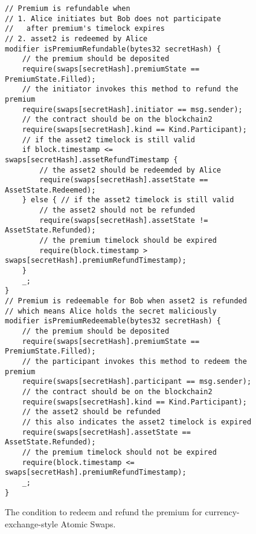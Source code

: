 \begin{figure}
\begin{lstlisting}[language=Solidity, basicstyle=\tiny]
// Premium is refundable when
// 1. Alice initiates but Bob does not participate
//   after premium's timelock expires
// 2. asset2 is redeemed by Alice
modifier isPremiumRefundable(bytes32 secretHash) {
    // the premium should be deposited
    require(swaps[secretHash].premiumState == PremiumState.Filled);
    // the initiator invokes this method to refund the premium
    require(swaps[secretHash].initiator == msg.sender);
    // the contract should be on the blockchain2
    require(swaps[secretHash].kind == Kind.Participant);
    // if the asset2 timelock is still valid
    if block.timestamp <= swaps[secretHash].assetRefundTimestamp {
        // the asset2 should be redeemded by Alice
        require(swaps[secretHash].assetState == AssetState.Redeemed);
    } else { // if the asset2 timelock is still valid
        // the asset2 should not be refunded
        require(swaps[secretHash].assetState != AssetState.Refunded);
        // the premium timelock should be expired
        require(block.timestamp > swaps[secretHash].premiumRefundTimestamp);
    }
    _;
}
// Premium is redeemable for Bob when asset2 is refunded
// which means Alice holds the secret maliciously
modifier isPremiumRedeemable(bytes32 secretHash) {
    // the premium should be deposited
    require(swaps[secretHash].premiumState == PremiumState.Filled);
    // the participant invokes this method to redeem the premium
    require(swaps[secretHash].participant == msg.sender);
    // the contract should be on the blockchain2
    require(swaps[secretHash].kind == Kind.Participant);
    // the asset2 should be refunded
    // this also indicates the asset2 timelock is expired
    require(swaps[secretHash].assetState == AssetState.Refunded);
    // the premium timelock should not be expired
    require(block.timestamp <= swaps[secretHash].premiumRefundTimestamp);
    _;
}
\end{lstlisting}
\label{code:premium_condition_currency}
\caption{The condition to redeem and refund the premium for currency-exchange-style Atomic Swaps.}
\end{figure}

